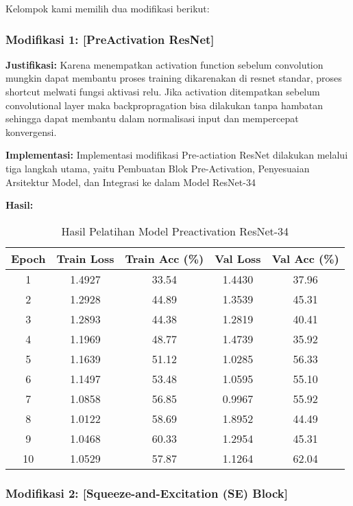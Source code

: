 \documentclass[11pt,a4paper]{article}
\begin{document}
Kelompok kami memilih dua modifikasi berikut:

\subsubsection{Modifikasi 1: [PreActivation ResNet]}

\textbf{Justifikasi:} Karena menempatkan activation function sebelum convolution mungkin dapat membantu proses training dikarenakan di resnet standar, proses shortcut melwati fungsi aktivasi relu. Jika activation ditempatkan sebelum convolutional layer maka backpropragation bisa dilakukan tanpa hambatan sehingga dapat membantu dalam normalisasi input dan mempercepat konvergensi.

\textbf{Implementasi:} Implementasi modifikasi Pre-actiation ResNet dilakukan melalui tiga langkah utama, yaitu Pembuatan Blok Pre-Activation, Penyesuaian Arsitektur Model, dan Integrasi ke dalam Model ResNet-34

\textbf{Hasil:} 

\begin{table}[H]
\centering
\caption{Hasil Pelatihan Model Preactivation ResNet-34}
\label{tab:Preactivation PreActivation-resnet34-results}
\begin{tabular}{ccccc}
\toprule
\textbf{Epoch} & \textbf{Train Loss} & \textbf{Train Acc (\%)} & \textbf{Val Loss} & \textbf{Val Acc (\%)} \\
\midrule
1 & 1.4927 & 33.54 & 1.4430 & 37.96 \\
2 & 1.2928 & 44.89 & 1.3539 & 45.31 \\
3 & 1.2893 & 44.38 & 1.2819 & 40.41\\
4 & 1.1969 & 48.77 & 1.4739 & 35.92 \\
5 & 1.1639 & 51.12 & 1.0285 & 56.33 \\
6 & 1.1497 & 53.48 & 1.0595 & 55.10 \\
7 & 1.0858 & 56.85 & 0.9967 & 55.92\\
8 & 1.0122 & 58.69 & 1.8952 & 44.49 \\
9 & 1.0468 & 60.33 & 1.2954 & 45.31 \\
10 &  1.0529 & 57.87 & 1.1264 & 62.04 \\

\bottomrule
\end{tabular}
\end{table}

\subsubsection{Modifikasi 2: [Squeeze-and-Excitation (SE) Block]}
\end{document}
